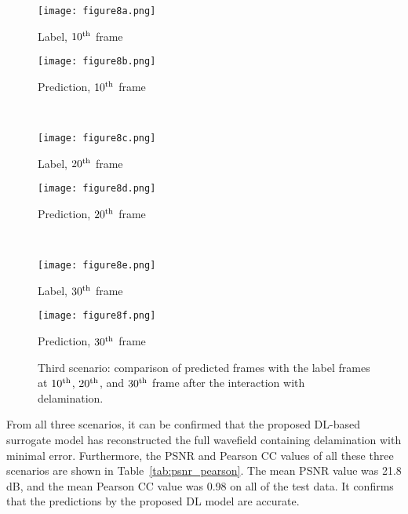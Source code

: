 \documentclass[sn-mathphys-num]{sn-jnl}%
\begin{document}
\begin{figure}
	\centering
	\begin{minipage}[b]{0.44\textwidth}
		\centering
		\texttt{[image: figure8a.png]}
		\caption*{Label, $10\textsuperscript{th}$ frame}
		\label{fig:num_462_label1}
	\end{minipage}
	\hfill
	\begin{minipage}[b]{0.44\textwidth}
		\centering
		\texttt{[image: figure8b.png]}
		\caption*{Prediction, $10\textsuperscript{th}$ frame}
		\label{fig:num_462_pred1}
	\end{minipage}
	\\
	\begin{minipage}[b]{0.44\textwidth}
		\centering
		\texttt{[image: figure8c.png]}
		\caption*{Label, $20\textsuperscript{th}$ frame}
		\label{fig:num_462_label2}
	\end{minipage}
	\hfill
	\begin{minipage}[b]{0.44\textwidth}
		\centering
		\texttt{[image: figure8d.png]}
		\caption*{Prediction, $20\textsuperscript{th}$ frame}
		\label{fig:num_462_pred2}
	\end{minipage}
	\\
	\begin{minipage}[b]{0.44\textwidth}
		\centering
		\texttt{[image: figure8e.png]}
		\caption*{Label, $30\textsuperscript{th}$ frame}
		\label{fig:num_462_label3}
	\end{minipage}
	\hfill
	\begin{minipage}[b]{0.44\textwidth}
		\centering
		\texttt{[image: figure8f.png]}
		\caption*{Prediction, $30\textsuperscript{th}$ frame }
		\label{fig:num_462_pred3}
	\end{minipage}
	\caption{Third scenario: comparison of predicted frames with the label 
	frames at $10\textsuperscript{th}$, $20\textsuperscript{th}$, and 
	$30\textsuperscript{th}$ frame after the interaction with 
	delamination.}
\label{fig:num_462}
\end{figure}
\clearpage
	From all three scenarios, it can be confirmed that the proposed DL-based 
	surrogate model has reconstructed the full wavefield containing 
	delamination with minimal error. 
	Furthermore, the PSNR and Pearson CC values of all these three scenarios 
	are shown in Table~\ref{tab:psnr_pearson}. 
	The mean PSNR value was 21.8 dB, and the mean Pearson CC value was 0.98 on 
	all of the test data.
	It confirms that the predictions by the proposed DL model are accurate.
	
\end{document}
